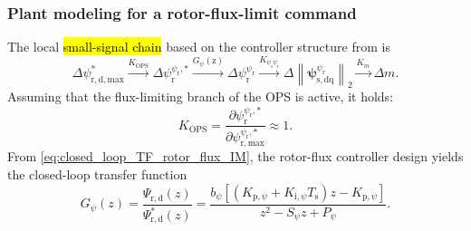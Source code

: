 \begin{frame}
    \frametitle{Plant modeling for a rotor-flux-limit command}
    The local \hl{small-signal chain} based on the controller structure from  is
    \begin{equation}
        \Delta\psi_{\mathrm{r,d,max}}^{*}
        \xrightarrow{K_{\mathrm{OPS}}}
        \Delta\psi_{\mathrm{r}}^{\psi_{\mathrm r},*}
        \xrightarrow{G_{\psi}(\mathrm{z})}
        \Delta\psi_{\mathrm{r}}^{\psi_{\mathrm r}}
        \xrightarrow{K_{\psi_{\mathrm{s}}\psi_{\mathrm r}}}
        \Delta\left\|\bm{\psi}_{\mathrm{s,dq}}^{\psi_{\mathrm r}}\right\|_2
        \xrightarrow{K_m}
        \Delta m .
        \label{eq:IM_mod_v06_actual_chain}
    \end{equation}\pause%
    Assuming that the flux-limiting branch of the OPS is active, it holds:
    \begin{equation}
        K_{\mathrm{OPS}}=\frac{\partial\psi_{\mathrm{r}}^{\psi_{\mathrm r},*}}{\partial\psi_{\mathrm{r,max}}^{\psi_{\mathrm r},*}}
        \approx 1 .
        \label{eq:IM_mod_v06_kops}
    \end{equation}\pause%
    From \eqref{eq:closed_loop_TF_rotor_flux_IM}, the rotor-flux controller design yields the closed-loop transfer function
    \[
        G_{\psi}(z)
        =
        \frac{\Psi_{\mathrm{r,d}}(z)}{\Psi_{\mathrm{r,d}}^*(z)}
        =
        \frac{
            b_\psi\left[(K_{\mathrm p,\psi}+K_{\mathrm i,\psi}T_{\mathrm s})z-K_{\mathrm p,\psi}\right]
        }{
            z^2-S_\psi z+P_\psi
        } .
    \]
\end{frame}

